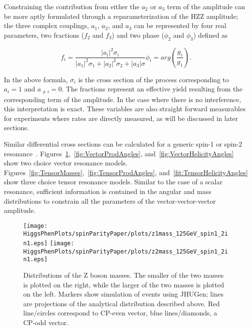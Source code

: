 Constraining the contribution
from either the $a_2$ or $a_3$ term of the amplitude can be more aptly 
formulated through a reparameterization of the HZZ amplitude; the 
three complex couplings, $a_1$, $a_2$, and $a_3$ can be represented by
four real parameters, two fractions ($f_2$ and $f_3$) and two phase 
($\phi_2$ and $\phi_3$) defined as
\begin{center}
\begin{subequations}
  \begin{equation}
    f_i = \frac{|a_i|^2\sigma_i }{|a_1|^2\sigma_1+|a_2|^2\sigma_2+|a_3|\sigma}
    \end{equation}
  \begin{equation}
    \phi_i = arg(\frac{g_i}{g_1}).
    \end{equation}
\end{subequations}
\end{center}
In the above formula, $\sigma_i$ is the cross section of the process 
corresponding
to $a_i=1$ and $a_{\neq i}=0$.  The fractions represent an effective yield 
resulting from the corresponding term of the amplitude.  In the case where
there is no interference, this interpretation is exact.  These variables
are also straight forward measurables for experiments where rates are 
directly measured, as will be discussed in later sections.  

Similar differential cross sections can be calculated for a generic spin-1 or spin-2 
resonance~\cite{??}.  
Figures~\ref{fig:VectorMasses},~\ref{fig:VectorProdAngles}, 
and~\ref{fig:VectorHelicityAngles} show two choice vector 
resonance models.  
Figures~\ref{fig:TensorMasses},~\ref{fig:TensorProdAngles}, 
and~\ref{fit:TensorHelicityAngles}
show three choice tensor 
resonance models.  Similar to the case of a scalar resonance, sufficient
information is contained in the angular and mass distributions to 
constrain all the parameters of the vector-vector-vector amplitude. 

\begin{figure}
\begin{center}
\texttt{[image: HiggsPhenPlots/spinParityPaper/plots/z1mass\_125GeV\_spin1\_2in1.eps]}
\texttt{[image: HiggsPhenPlots/spinParityPaper/plots/z2mass\_125GeV\_spin1\_2in1.eps]}
\label{fig:VectorMasses}
\caption{Distributions of the Z boson masses.  The smaller of the two masses is
plotted on the right, while the larger of the two masses is plotted on the
left. Markers show simulation of events using JHUGen; lines are projections
of the analytical distribution described above.  Red line/circles correspond
to CP-even vector, blue lines/diamonds, a CP-odd vector.}
\end{center}
\end{figure}

